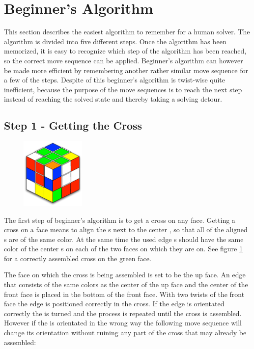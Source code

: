 \section{Beginner's Algorithm}
\label{sec:beginner}
This section describes the easiest algorithm to remember for a human solver.
The algorithm is divided into five different steps. Once the algorithm has been memorized, it is easy to recognize which step of the algorithm has been reached, so the correct move sequence can be applied. 
Beginner's algorithm can however be made more efficient by remembering another rather similar move sequence for a few of the steps. 
Despite of this beginner's algorithm is twist-wise quite inefficient, because the purpose of the move sequences is to reach the next step instead of reaching the solved state and thereby taking a solving detour. 

\subsection{Step 1 - Getting the Cross}\label{sub:step1}
\begin{figure}
\vspace{-8mm}
\begin{center}
	\includegraphics[width=0.28\textwidth]{input/pics/1FLcross.pdf}	
\end{center}
\caption{}
\label{fig:1FL-cross}
\end{figure}
The first step of beginner's algorithm \cite{beginner} is to get a cross on any face. 
Getting a cross on a face means to align the \facelet{}s next to the center \facelet{}, so that all of the aligned \facelet{}s are of the same color. 
At the same time the used edge \cpiece{}s should have the same color of the center \facelet{}s on each of the two faces on which they are on. See figure \ref{fig:1FL-cross} for a correctly assembled cross on the green face.



The face on which the cross is being assembled is set to be the up face. 
An edge \cpiece{} that consists of the same colors as the center \cpiece{} of the up face and the center \cpiece{} of the front face is placed in the bottom of the front face. 
With two twists of the front face the edge \cpiece{} is positioned correctly in the cross. 
If the edge \cpiece{} is orientated correctly the \cube{} is turned and the process is repeated until the cross is assembled. 
However if the \cpiece{} is orientated in the wrong way the following move sequence will change its orientation without ruining any part of the cross that may already be assembled: \\

